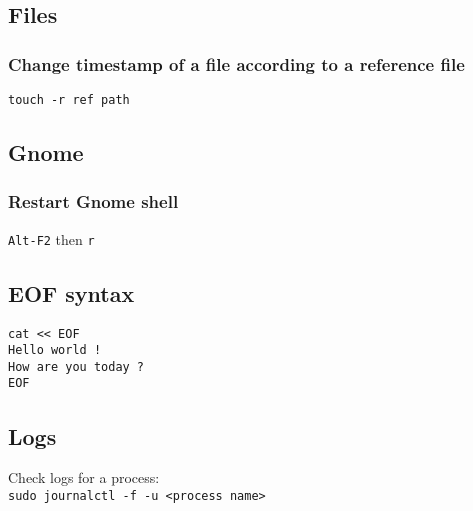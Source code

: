 \subsection{Files}
\subsubsection{Change timestamp of a file according to a reference file}
\verb|touch -r ref path|

\subsection{Gnome}
\subsubsection{Restart Gnome shell}
\verb|Alt-F2| then \verb|r|

\subsection{EOF syntax}
\begin{verbatim}
cat << EOF
Hello world !
How are you today ?
EOF
\end{verbatim}

\subsection{Logs}
Check logs for a process:\\
\verb|sudo journalctl -f -u <process name>|
